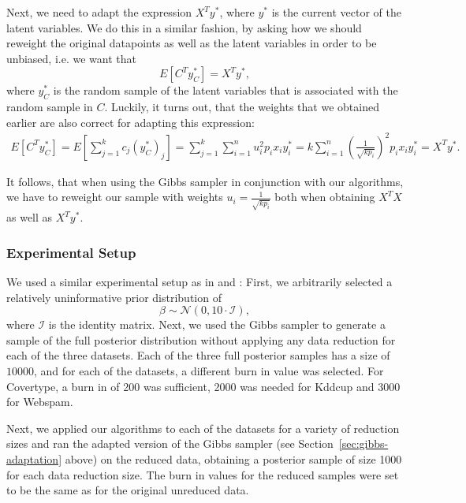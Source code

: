 Next, we need to adapt the expression
$X^Ty^\ast$, where $y^\ast$ is the current vector of the latent
variables. We do this in a similar fashion, by asking
how we should reweight the original datapoints as well as the
latent variables in order to be unbiased, i.e. we want that
\begin{equation*}
    E\left[ C^T y_C^\ast \right] = X^T y^\ast,
\end{equation*}
where $y_C^\ast$ is the random sample of the latent variables that
is associated with the random sample in $C$.
Luckily, it turns out, that the weights that we obtained earlier
are also correct for adapting this expression:
\begin{align*}
    E\left[ C^T y_C^\ast \right] = E\left[ \sum_{j=1}^k c_j (y_C^\ast)_j \right]
    = \sum_{j=1}^k \sum_{i=1}^n u_i^2 p_i x_i y^\ast_i
    = k \sum_{i=1}^n \left(\frac{1}{\sqrt{kp_i}}\right)^2 p_i x_i y^\ast_i
    = X^T y^\ast.
\end{align*}

It follows, that when using the Gibbs sampler in conjunction
with our algorithms, we have to reweight our sample with weights
$u_i = \frac{1}{\sqrt{k p_i}}$ both when obtaining $X^TX$ as
well as $X^Ty^\ast$.

\subsubsection{Experimental Setup}

We used a similar experimental setup
as in \cite{scalable-bayesian-logreg} and
\cite{bayesian-regression}:
First, we arbitrarily selected a relatively uninformative
prior distribution of
\begin{equation*}
    \beta \sim \mathcal{N}(0, 10 \cdot \mathcal{I}),
\end{equation*}
where $\mathcal{I}$ is the identity matrix.
Next, we used the Gibbs sampler
to generate a sample of the full posterior
distribution without applying any data reduction for each
of the three datasets.
Each of the three full posterior samples has a size of $10000$,
and for each of the datasets, a different
burn in value was selected. For Covertype, a burn in
of 200 was sufficient, 2000 was needed for Kddcup and 3000
for Webspam.

Next, we applied our algorithms to each of the datasets
for a variety of reduction sizes and ran the adapted version of
the Gibbs sampler (see Section~\ref{sec:gibbs-adaptation} above)
on the reduced data, obtaining a posterior sample of size 1000
for each data reduction size. The burn in values for
the reduced samples were set to be
the same as for the original unreduced data.


